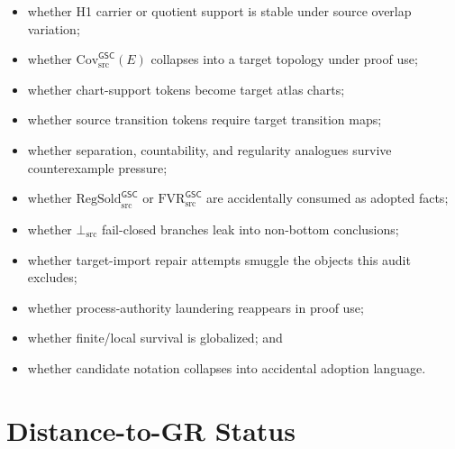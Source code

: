 \documentclass[11pt]{article}
\newcommand{\RegSold}{\mathrm{RegSold}_{\mathrm{src}}^{\mathsf{GSC}}}
\newcommand{\FVR}{\mathrm{FVR}_{\mathrm{src}}^{\mathsf{GSC}}}
\newcommand{\BottomSrc}{\bot_{\mathrm{src}}}
\newcommand{\CovSrc}{\mathrm{Cov}_{\mathrm{src}}^{\mathsf{GSC}}}
\begin{document}
\begin{itemize}[leftmargin=*]
  \item whether H1 carrier or quotient support is stable under source overlap
  variation;
  \item whether \(\CovSrc(E)\) collapses into a target topology under proof use;
  \item whether chart-support tokens become target atlas charts;
  \item whether source transition tokens require target transition maps;
  \item whether separation, countability, and regularity analogues survive
  counterexample pressure;
  \item whether \(\RegSold\) or \(\FVR\) are accidentally consumed as adopted
  facts;
  \item whether \(\BottomSrc\) fail-closed branches leak into non-bottom
  conclusions;
  \item whether target-import repair attempts smuggle the objects this audit
  excludes;
  \item whether process-authority laundering reappears in proof use;
  \item whether finite/local survival is globalized; and
  \item whether candidate notation collapses into accidental adoption language.
\end{itemize}

\section{Distance-to-GR Status}
\end{document}
